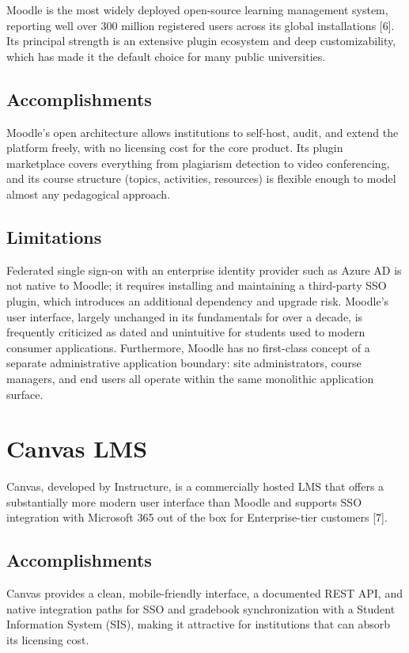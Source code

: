 \documentclass[12pt,a4paper]{report}
\begin{document}
Moodle is the most widely deployed open-source learning management
system, reporting well over 300 million registered users across its
global installations [6]. Its principal strength is an extensive plugin
ecosystem and deep customizability, which has made it the default choice
for many public universities.

\subsection{Accomplishments}

Moodle's open architecture allows institutions to self-host, audit, and
extend the platform freely, with no licensing cost for the core
product. Its plugin marketplace covers everything from plagiarism
detection to video conferencing, and its course structure (topics,
activities, resources) is flexible enough to model almost any pedagogical
approach.

\subsection{Limitations}

Federated single sign-on with an enterprise identity provider such as
Azure AD is not native to Moodle; it requires installing and
maintaining a third-party SSO plugin, which introduces an additional
dependency and upgrade risk. Moodle's user interface, largely unchanged
in its fundamentals for over a decade, is frequently criticized as
dated and unintuitive for students used to modern consumer applications.
Furthermore, Moodle has no first-class concept of a separate
administrative application boundary: site administrators, course
managers, and end users all operate within the same monolithic
application surface.

\section{Canvas LMS}

Canvas, developed by Instructure, is a commercially hosted LMS that
offers a substantially more modern user interface than Moodle and
supports SSO integration with Microsoft 365 out of the box for
Enterprise-tier customers [7].

\subsection{Accomplishments}

Canvas provides a clean, mobile-friendly interface, a documented REST
API, and native integration paths for SSO and gradebook synchronization
with a Student Information System (SIS), making it attractive for
institutions that can absorb its licensing cost.
\end{document}

